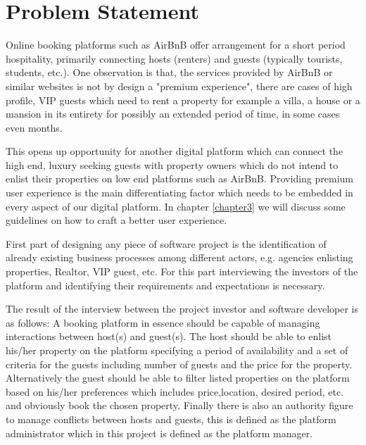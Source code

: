 

\section{Problem Statement}\label{sec:problem_statement}
Online booking platforms such as AirBnB offer arrangement for a short period hospitality, primarily connecting hosts (renters) and guests (typically tourists, students, etc.). One observation is that, the services provided by AirBnB or similar websites is not by design a "premium experience", there are cases of high profile, VIP guests which need to rent a property for example a villa, a house or a mansion in its entirety for possibly an extended period of time, in some cases even months.

This opens up opportunity for another digital platform which can connect the high end, luxury seeking guests with property owners which do not intend to enlist their properties on low end platforms such as AirBnB. Providing premium user experience is the main differentiating factor which needs to be embedded in every aspect of our digital platform. In chapter \ref{chapter3} we will discuss some guidelines on how to craft a better user experience.

First part of designing any piece of software project is the identification of already existing business processes among different actors, e.g. agencies enlisting properties, Realtor, VIP guest, etc. For this part interviewing the investors of the platform and identifying their requirements and expectations is necessary. 

The result of the interview between the project investor and software developer is as follows: 
A booking platform in essence should be capable of managing interactions between host(s) and guest(s). 
The host should be able to enlist his/her property on the platform specifying a period of availability and  a set of criteria for the guests including number of guests and the price for the property. Alternatively the guest should be able to filter listed properties on the platform based on his/her preferences which includes price,location, desired period, etc. and obviously book the chosen property.
Finally there is also an authority figure to manage conflicts between hosts and guests, this is defined as the platform administrator which in this project is defined as the platform manager.

